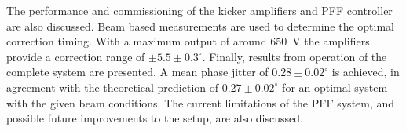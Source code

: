 {The performance and commissioning of the kicker amplifiers and PFF controller are also discussed. Beam based measurements are used to determine the optimal correction timing. With a maximum output of around 650~V the amplifiers provide a correction range of \(\pm5.5\pm0.3^\circ\). Finally, results from operation of the complete system are presented. A mean phase jitter of \(0.28\pm0.02^\circ\) is achieved, in agreement with the theoretical prediction of \(0.27\pm0.02^\circ\) for an optimal system with the given beam conditions. The current limitations of the PFF system, and possible future improvements to the setup, are also discussed.

}
